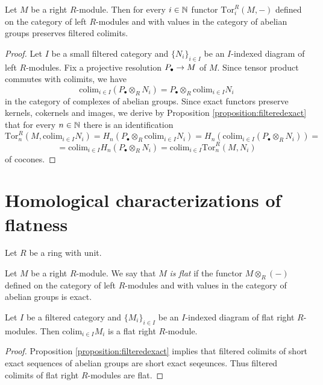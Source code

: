 \begin{corollary}\label{corollary:torpreservesfiltered}
Let $M$ be a right $R$-module. Then for every $i\in {\mathbb N}$ functor $\mathrm{Tor}^R_i(M,-)$ defined on the category of left $R$-modules and with values in the category of abelian groups preserves filtered colimits.
\end{corollary}
\begin{proof}
Let $I$ be a small filtered category and $\{N_i\}_{i\in I}$ be an $I$-indexed diagram of left $R$-modules. Fix a projective resolution $P_{\bullet}\rightarrow M$ of $M$. Since tensor product commutes with colimits, we have 
$$\mathrm{colim}_{i\in I}\left(P_{\bullet}\otimes_RN_i\right)=P_{\bullet}\otimes_R\mathrm{colim}_{i\in I}N_i$$
in the category of complexes of abelian groups. Since exact functors preserve kernels, cokernels and images, we derive by Proposition \ref{proposition:filteredexact} that for every $n\in {\mathbb N}$ there is an identification
$$\mathrm{Tor}^R_n\left(M,\mathrm{colim}_{i\in I}N_i\right)=H_n\left(P_{\bullet}\otimes_R\mathrm{colim}_{i\in I}N_i\right)=H_n\left(\mathrm{colim}_{i\in I}\left(P_{\bullet}\otimes_RN_i\right)\right)=$$
$$=\mathrm{colim}_{i\in I}H_n\left(P_{\bullet}\otimes_RN_i\right)=\mathrm{colim}_{i\in I}\mathrm{Tor}^R_n\left(M,N_i\right)$$
of cocones.
\end{proof}

\section{Homological characterizations of flatness}
\noindent
Let $R$ be a ring with unit.

\begin{definition}
Let $M$ be a right $R$-module. We say that $M$ \textit{is flat} if the functor $M\otimes_R(-)$ defined on the category of left $R$-modules and with values in the category of abelian groups is exact.
\end{definition}

\begin{proposition}\label{proposition:flatcolimits}
Let $I$ be a filtered category and $\{M_i\}_{i\in I}$ be an $I$-indexed diagram of flat right $R$-modules. Then $\mathrm{colim}_{i\in I}M_i$ is a flat right $R$-module.
\end{proposition}
\begin{proof}
Proposition \ref{proposition:filteredexact} implies that filtered colimits of short exact sequences of abelian groups are short exact seqeunces. Thus filtered colimits of flat right $R$-modules are flat.
\end{proof}

